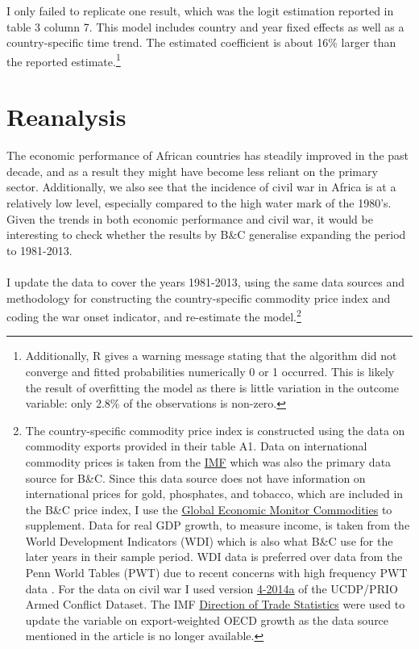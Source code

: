 \documentclass[a4paper,11pt]{article}
\begin{document}
I only failed to replicate one result, which was the logit estimation reported in table 3 column 7. 
This model includes country and year fixed effects as well as a country-specific time trend. 
The estimated coefficient is about 16\% larger than the reported estimate.\footnote{Additionally, R gives a warning message stating that the algorithm did not converge and fitted probabilities numerically 0 or 1 occurred. This is likely the result of overfitting the model as there is little variation in the outcome variable: only 2.8\% of the observations is non-zero.} 
\section{Reanalysis}
The economic performance of African countries has steadily improved in the past decade, and as a result they might have become less reliant on the primary sector. 
Additionally, we also see that the incidence of civil war in Africa is at a relatively low level, especially compared to the high water mark of the 1980's. 
Given the trends in both economic performance and civil war, it would be interesting to check whether the results by B\&C generalise expanding the period to 1981-2013.\\\\
I update the data to cover the years 1981-2013, using the same data sources and methodology for constructing the country-specific commodity price index and coding the war onset indicator, and re-estimate the model.\footnote{The country-specific commodity price index is constructed using the data on commodity exports provided in their table A1. Data on international commodity prices is taken from the \href{http://www.imf.org/external/np/res/commod/External_Data.xls}{IMF} which was also the primary data source for B\&C. Since this data source does not have information on international prices for gold, phosphates, and tobacco, which are included in the B\&C price index, I use the \href{http://data.worldbank.org/data-catalog/commodity-price-data}{Global Economic Monitor Commodities} to supplement. Data for real GDP growth, to measure income, is taken from the World Development Indicators (WDI) which is also what B\&C use for the later years in their sample period. WDI data is preferred over data from the Penn World Tables (PWT) due to recent concerns with high frequency PWT data \citep{Johnson2009}. For the data on civil war I used version \href{http://www.pcr.uu.se/research/ucdp/datasets/ucdp_prio_armed_conflict_dataset/}{4-2014a} of the UCDP/PRIO Armed Conflict Dataset. The IMF \href{http://elibrary-data.imf.org/QueryBuilder.aspx?key=19784661&s=322}{Direction of Trade Statistics} were used to update the variable on export-weighted OECD growth as the data source mentioned in the article is no longer available.}
\end{document}
